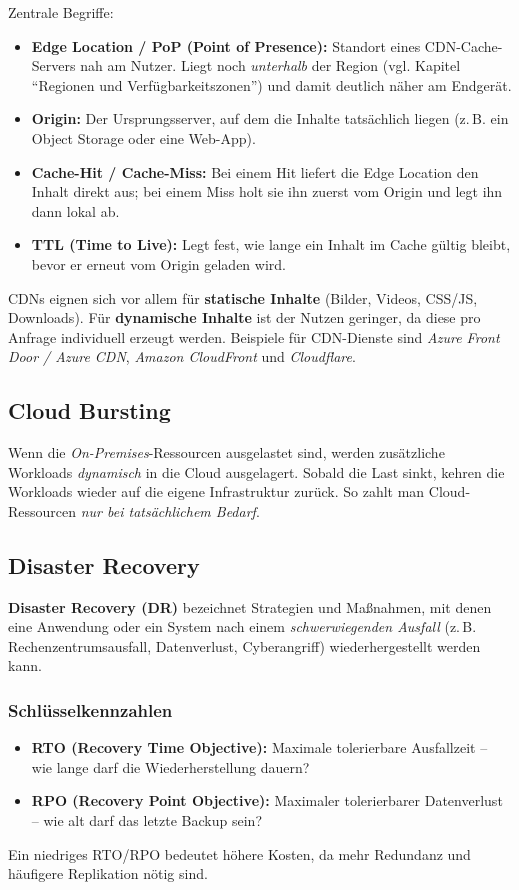 Zentrale Begriffe:
\begin{itemize}
    \item \textbf{Edge Location / PoP (Point of Presence):} Standort eines
          CDN-Cache-Servers nah am Nutzer. Liegt noch \emph{unterhalb} der Region
          (vgl. Kapitel \enquote{Regionen und Verfügbarkeitszonen}) und damit
          deutlich näher am Endgerät.
    \item \textbf{Origin:} Der Ursprungsserver, auf dem die Inhalte tatsächlich
          liegen (z.\,B. ein Object Storage oder eine Web-App).
    \item \textbf{Cache-Hit / Cache-Miss:} Bei einem Hit liefert die Edge Location
          den Inhalt direkt aus; bei einem Miss holt sie ihn zuerst vom Origin und
          legt ihn dann lokal ab.
    \item \textbf{TTL (Time to Live):} Legt fest, wie lange ein Inhalt im Cache
          gültig bleibt, bevor er erneut vom Origin geladen wird.
\end{itemize}

CDNs eignen sich vor allem für \textbf{statische Inhalte} (Bilder, Videos,
CSS/JS, Downloads). Für \textbf{dynamische Inhalte} ist der Nutzen geringer, da
diese pro Anfrage individuell erzeugt werden. Beispiele für CDN-Dienste sind
\textit{Azure Front Door / Azure CDN}, \textit{Amazon CloudFront} und
\textit{Cloudflare}.

\subsection{Cloud Bursting}
Wenn die \textit{On-Premises}-Ressourcen ausgelastet sind, werden zusätzliche Workloads \emph{dynamisch} in die Cloud ausgelagert. Sobald die Last sinkt, kehren die Workloads wieder auf die eigene Infrastruktur zurück. So zahlt man Cloud-Ressourcen \emph{nur bei tatsächlichem Bedarf}.

\subsection{Disaster Recovery}
\textbf{Disaster Recovery (DR)} bezeichnet Strategien und Maßnahmen, mit denen eine Anwendung oder ein System nach einem \emph{schwerwiegenden Ausfall} (z.\,B. Rechenzentrumsausfall, Datenverlust, Cyberangriff) wiederhergestellt werden kann.

\subsubsection{Schlüsselkennzahlen}
\begin{itemize}
    \item \textbf{RTO (Recovery Time Objective):} Maximale tolerierbare Ausfallzeit -- wie lange darf die Wiederherstellung dauern?
    \item \textbf{RPO (Recovery Point Objective):} Maximaler tolerierbarer Datenverlust -- wie alt darf das letzte Backup sein?
\end{itemize}
Ein niedriges RTO/RPO bedeutet höhere Kosten, da mehr Redundanz und häufigere Replikation nötig sind.

